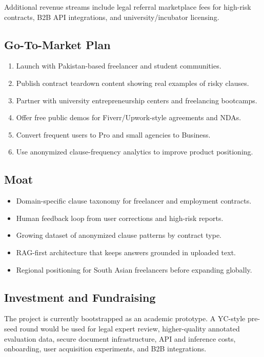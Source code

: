 \documentclass[11pt,a4paper]{article}
\begin{document}
Additional revenue streams include legal referral marketplace fees for high-risk contracts, B2B API integrations, and university/incubator licensing.

\subsection{Go-To-Market Plan}

\begin{enumerate}
\item Launch with Pakistan-based freelancer and student communities.
\item Publish contract teardown content showing real examples of risky clauses.
\item Partner with university entrepreneurship centers and freelancing bootcamps.
\item Offer free public demos for Fiverr/Upwork-style agreements and NDAs.
\item Convert frequent users to Pro and small agencies to Business.
\item Use anonymized clause-frequency analytics to improve product positioning.
\end{enumerate}

\subsection{Moat}

\begin{itemize}
\item Domain-specific clause taxonomy for freelancer and employment contracts.
\item Human feedback loop from user corrections and high-risk reports.
\item Growing dataset of anonymized clause patterns by contract type.
\item RAG-first architecture that keeps answers grounded in uploaded text.
\item Regional positioning for South Asian freelancers before expanding globally.
\end{itemize}

\subsection{Investment and Fundraising}

The project is currently bootstrapped as an academic prototype. A YC-style pre-seed round would be used for legal expert review, higher-quality annotated evaluation data, secure document infrastructure, API and inference costs, onboarding, user acquisition experiments, and B2B integrations.
\end{document}
